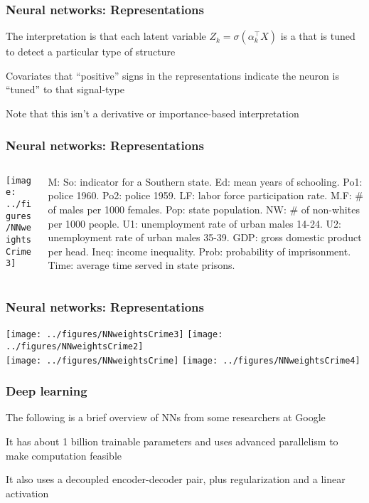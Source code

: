 \documentclass[12pt]{beamer}
\begin{document}
\begin{frame}[fragile]
\frametitle{Neural networks: Representations}
The interpretation is that each latent variable $Z_k = \sigma(\alpha_k^{\top}X)$ is
a  that is tuned to detect a particular type of structure

\vsp
Covariates that  ``positive'' signs in the representations indicate the neuron is ``tuned''
to that signal-type

\vsp
Note that this isn't  a derivative or importance-based interpretation
\end{frame}
\begin{frame}[fragile]
\frametitle{Neural networks: Representations}
\begin{columns}
\begin{column}{2.4in}
\texttt{[image: ../figures/NNweightsCrime3]}
\end{column}
\begin{column}{3in}
\begin{blockcode}

M:  %
So: indicator for a Southern state.
Ed: mean years of schooling.
Po1: police  1960.
Po2:  police 1959.
LF:  labor force participation rate.
M.F: # of males per 1000 females.
Pop: state population.
NW: # of non-whites per 1000 people.
U1:  unemployment rate of urban males 14-24.
U2: unemployment rate of urban males 35-39.
GDP: gross domestic product per head.
Ineq: income inequality.
Prob: probability of imprisonment.
Time: average time served in state prisons.
\end{blockcode}
\end{column}
\end{columns}
\end{frame}

\begin{frame}[fragile]
\frametitle{Neural networks: Representations}
\texttt{[image: ../figures/NNweightsCrime3]}
\texttt{[image: ../figures/NNweightsCrime2]}\\
\texttt{[image: ../figures/NNweightsCrime]}
\texttt{[image: ../figures/NNweightsCrime4]}\\

\end{frame}


\begin{frame}[fragile]
\frametitle{Deep learning}
The following is a brief overview of NNs from some researchers at Google


\vsp
It has about 1 billion trainable parameters and uses advanced parallelism to make computation feasible

\vsp
It also uses a decoupled encoder-decoder pair, plus regularization and a linear activation

\end{frame}
\end{document}
